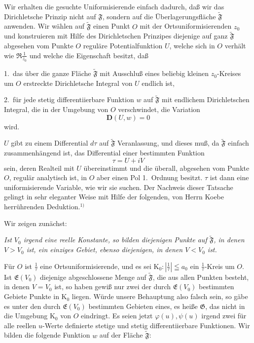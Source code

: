 \documentclass{article}
\begin{document}
Wir erhalten die gesuchte Uniformisierende einfach dadurch, daß wir das Dirichletsche Prinzip nicht auf $\mathfrak{F}$, sondern auf die Überlagerungsfläche $\widetilde{\mathfrak{F}}$ anwenden. Wir wählen auf $\widetilde{\mathfrak{F}}$ einen Punkt $O$ mit der Ortsuniformisierenden $z_0$ und konstruieren mit Hilfe des Dirichletschen Prinzipes diejenige auf ganz $\widetilde{\mathfrak{F}}$ abgesehen vom Punkte $O$ reguläre Potentialfunktion $U$, welche sich in $O$ verhält wie $\Re \frac{1}{z_0}$ und welche die Eigenschaft besitzt, daß

1.\ das über die ganze Fläche $\widetilde{\mathfrak{F}}$ mit Ausschluß eines beliebig kleinen $z_0$-Kreises um $O$ erstreckte Dirichletsche Integral von $U$ endlich ist,

2.\ für jede stetig differentiierbare Funktion $w$ auf $\widetilde{\mathfrak{F}}$ mit endlichem Dirichletschen Integral, die in der Umgebung von $O$ verschwindet, die Variation
\[ \mathbf{D}(U, w) = 0 \]
wird.

$U$ gibt zu einem Differential $d\tau$ auf $\widetilde{\mathfrak{F}}$ Veranlassung, und dieses muß, da $\widetilde{\mathfrak{F}}$ einfach zusammenhängend ist, das Differential einer bestimmten Funktion
\[ \tau = U + iV \]
sein, deren Realteil mit $U$ übereinstimmt und die überall, abgesehen vom Punkte $O$, regulär analytisch ist, in $O$ aber einen Pol 1.\ Ordnung besitzt. $\tau$ ist dann eine uniformisierende Variable, wie wir sie suchen. Der Nachweis dieser Tatsache gelingt in sehr eleganter Weise mit Hilfe der folgenden, von Herrn Koebe herrührenden Deduktion.${}^{1)}$

Wir zeigen zunächst:

\emph{Ist $V_0$ irgend eine reelle Konstante, so bilden diejenigen Punkte auf $\widetilde{\mathfrak{F}}$, in denen $V > V_0$ ist, ein einziges Gebiet, ebenso diejenigen, in denen $V < V_0$ ist.}

Für $O$ ist $\frac{1}{\tau}$ eine Ortsuniformisierende, und es sei $\mathrm{K}_0 \colon \left|\frac{1}{\tau}\right| \leqq a_0$ ein $\frac{1}{\tau}$-Kreis um $O$. Ist $\mathfrak{E}(V_0)$ diejenige abgeschlossene Menge auf $\widetilde{\mathfrak{F}}$, die aus allen Punkten besteht, in denen $V = V_0$ ist, so haben gewiß nur zwei der durch $\mathfrak{E}(V_0)$ bestimmten Gebiete Punkte in $\mathrm{K}_0$ liegen. Würde unsere Behauptung also falsch sein, so gäbe es unter den durch $\mathfrak{E}(V_0)$ bestimmten Gebieten eines, es heiße $\mathfrak{G}$, das nicht in die Umgebung $\mathrm{K}_0$ von $O$ eindringt. Es seien jetzt $\varphi(u), \psi(u)$ irgend zwei für alle reellen $u$-Werte definierte stetige und stetig differentiierbare Funktionen. Wir bilden die folgende Funktion $w$ auf der Fläche $\widetilde{\mathfrak{F}}$:
\end{document}
